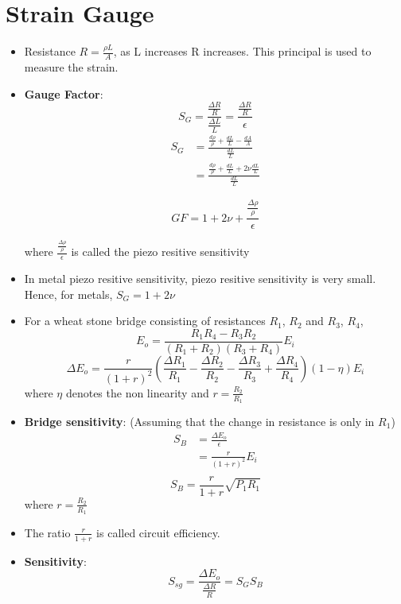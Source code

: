 \documentclass{article}
\begin{document}
\section{Strain Gauge}
	\begin{itemize}
		\item Resistance $R = \frac{\rho L}{A}$, as L increases R increases. This principal is used to measure the strain. 
		\item \textbf{Gauge Factor}: 
			\[S_G = \frac{\frac{\Delta R}{R}}{\frac{\Delta L}{L}} = \frac{\frac{\Delta R}{R}}{\epsilon}\]
			\begin{align*}
				S_G &= \frac{\frac{d\rho}{\rho} + \frac{dL}{L} - \frac{dA}{A}}{\frac{dL}{L}}\\
				   &= \frac{\frac{d\rho}{\rho} + \frac{dL}{L} + 2 \nu \frac{dL}{L}}{\frac{dL}{L}}
			\end{align*}

			\[\boxed{GF = 1+ 2\nu +\frac{\frac{\Delta \rho}{\rho}}{\epsilon}}\]

			where $\frac{\frac{\Delta \rho}{\rho}}{\epsilon}$ is called the piezo resitive sensitivity

		\item In metal piezo resitive sensitivity, piezo resitive sensitivity is very small. Hence, for metals, $S_G = 1+2\nu$

		\item For a wheat stone bridge consisting of resistances $R_1$, $R_2$ and $R_3$, $R_4$, 
		\[E_o = \frac{R_1 R_4 - R_3 R_2}{(R_1 + R_2)(R_3+R_4)}E_i\]
		\[{\Delta E_o} = \frac{r}{(1+r)^2} \left( \frac{\Delta R_1}{R_1} - \frac{\Delta R_2}{R_2} - \frac{\Delta R_3}{R_3} + \frac{\Delta R_4}{R_4} \right ) (1-\eta) E_i\]
		where $\eta$ denotes the non linearity and $r=\frac{R_2}{R_1}$

		\item \textbf{Bridge sensitivity}: 
		(Assuming that the change in resistance is only in $R_1$)
		\begin{align*}
			S_B &= \frac{\Delta E_o}{\epsilon}\\
				&= \frac{r}{(1+r)^2}E_i\\
		\end{align*}
		\[\boxed{S_B = \frac{r}{1+r} \sqrt{P_1R_1}}\]
		where $r=\frac{R_2}{R_1}$

		\item The ratio $\frac{r}{1+r}$ is called circuit efficiency.

		\item \textbf{Sensitivity}:
		\[S_{sg} = \frac{\Delta E_o}{\frac{\Delta R}{R}} = S_G S_B\]
	\end{itemize}
\end{document}
